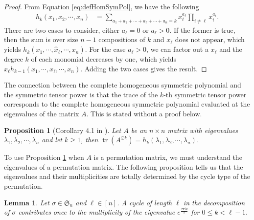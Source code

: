 \documentclass[12pt]{amsart}
\newtheorem{proposition}{Proposition}[section]
\newtheorem{lemma}{Lemma}[section]
\newcommand{\tr}{\operatorname{tr}}
\begin{document}
\begin{proof}
    From Equation \ref{eq:defHomSymPol}, we have the following
    \begin{align*}
        h_k(x_1,x_2,\cdots, x_n) &= \sum _{a_1+a_2+\cdots +a_{\ell}+\cdots +a_n = k}x_{\ell}^{a_{\ell}}\prod _{i \neq \ell}x_i^{a_i}.
    \end{align*}
    There are two cases to consider, either $a_{\ell}=0$ or $a_{\ell}>0$. If the former is true, then the sum is over size $n-1$ compositions of $k$ and $x_{\ell}$ does not appear, which yields $h_k(x_1,\cdots ,\hat{x}_{\ell},\cdots ,x_n)$. For the case $a_{\ell}>0$, we can factor out a $x_{\ell}$ and the degree $k$ of each monomial decreases by one, which yields $x_{\ell}h_{k-1}(x_1,\cdots , x_{\ell},\cdots ,x_n)$. Adding the two cases gives the result.
    
\end{proof}
The connection between the complete homogeneous symmetric polynomial and the symmetric tensor power is that the trace of the $k$-th symmetric tensor power corresponds to the complete homogeneous symmetric polynomial evaluated at the eigenvalues of the matrix $A$. This is stated without a proof below.
\begin{proposition}[Corollary 4.1 in \cite{AstaizaetAl2026}]
\label{prop:trace}
    Let $A$ be an $n \times n$ matrix with eigenvalues $\lambda _1,\lambda _2,\cdots , \lambda _n$ and let $k\geq 1$, then $\tr \left (A^{\odot k}\right ) = h_k(\lambda _1,\lambda _2,\cdots ,\lambda _n)$.
\end{proposition}

To use Proposition \ref{prop:trace} when $A$ is a permutation matrix, we must understand the eigenvalues of a permutation matrix. The following proposition tells us that the eigenvalues and their multiplicities are totally determined by the cycle type of the permutation.
    \begin{lemma}
    \label{lemma:eigenvalues}
        Let $\sigma \in \mathfrak{S}_n$ and $\ell \in [n]$. A cycle of length $\ell$ in the decomposition of $\sigma$ contributes once to the multiplicity of the eigenvalue $e^{\frac{2\pi i k}{\ell}}$ for $0 \le k < \ell-1$.
    \end{lemma}
    
\end{document}
